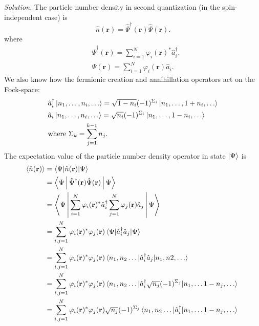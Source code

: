 \documentclass[11pt, a4paper]{article}
\newcommand{\bb}[1]{\mathbf{#1}}
\begin{document}
\begin{enumerate}
    \par \textit{Solution.}
    The particle number density in second quantization (in the spin-independent case) is
    \begin{equation*}
        \hat n (\bb r) = \hat \Psi^{\dagger}(\bb r)\hat \Psi(\bb r).
    \end{equation*}
    where 
    \begin{align*}
        &\hat \Psi^{\dagger}(\bb r) = \sum\limits_{i = 1}^N \varphi_i(\bb r)^{*}\hat a_i^{\dagger}. \\
        &\hat \Psi(\bb r) = \sum\limits_{i = 1}^N \varphi_i(\bb r)\hat a_i.
    \end{align*}
    We also know how the fermionic creation and annihillation operators act on the Fock-space:
    \begin{align*}
        &\hat a_i^{\dagger} \ket{n_1, \dots, n_i, \dots} = \sqrt{1-n_i}(-1)^{\Sigma_i}\ket{n_1, \dots, 1+n_i, \dots}\\
        &\hat a_i \ket{n_1, \dots, n_i, \dots} = \sqrt{n_i}(-1)^{\Sigma_i}\ket{n_1, \dots, 1-n_i, \dots}\\
        & \textrm{where}~\Sigma_k = \sum\limits_{j=1}^{k-1}n_j.
    \end{align*}
    The expectation value of the particle number density operator in state $\ket \Psi$ is 
    \begin{align*}
        \langle \hat n(\bb r) \rangle &= \braket{\Psi |\hat n(\bb r)|\Psi}\\
        & = \Braket{\Psi |\hat \Psi^{\dagger}(\bb r)\hat \Psi(\bb r)|\Psi}\\
        & = \Braket{\Psi |\sum\limits_{i = 1}^N \varphi_i(\bb r)^{*}\hat a_i^{\dagger} \sum\limits_{j = 1}^N \varphi_j(\bb r)\hat a_j|\Psi}\\
        & = \sum\limits_{i,j = 1}^N \varphi_i(\bb r)^{*}\varphi_j(\bb r) \braket{\Psi|\hat a_i^{\dagger}\hat a_j|\Psi}\\
        & = \sum\limits_{i,j = 1}^N \varphi_i(\bb r)^{*}\varphi_j(\bb r)\braket{n_1,n_2 \dots | \hat a_i^{\dagger}\hat a_j|n_1, n2, \dots}\\
        & = \sum\limits_{i,j = 1}^N \varphi_i(\bb r)^{*}\varphi_j(\bb r)\braket{n_1,n_2 \dots | \hat a_i^{\dagger}\sqrt{n_j}(-1)^{\Sigma_j}| n_1, \dots 1-n_j, \dots} \\
        & = \sum\limits_{i,j = 1}^N \varphi_i(\bb r)^{*}\varphi_j(\bb r) \sqrt{n_j}(-1)^{\Sigma_j} \braket{n_1,n_2 \dots |\hat a_i^{\dagger}| n_1, \dots 1-n_j, \dots}\\

\end{align*}
\end{enumerate}
\end{document}
